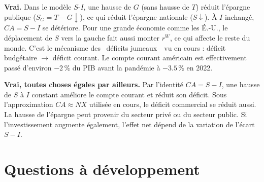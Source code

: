 
\begin{reponse}
\textbf{Vrai.} Dans le modèle $S$-$I$, une hausse de $G$ (sans hausse de $T$) réduit l'épargne publique ($S_G = T - G \downarrow$), ce qui réduit l'épargne nationale ($S \downarrow$). À $I$ inchangé, $CA = S - I$ se détériore. Pour une grande économie comme les É.-U., le déplacement de $S$ vers la gauche fait aussi monter $r^W$, ce qui affecte le reste du monde. C'est le mécanisme des \guillemotleft~déficits jumeaux~\guillemotright\ vu en cours : déficit budgétaire $\to$ déficit courant. Le compte courant américain est effectivement passé d'environ $-2\,\%$ du PIB avant la pandémie à $-3.5\,\%$ en 2022.
\end{reponse}


\begin{reponse}
\textbf{Vrai, toutes choses égales par ailleurs.} Par l'identité $CA = S - I$, une hausse de $S$ à $I$ constant améliore le compte courant et réduit son déficit. Sous l'approximation $CA \approx NX$ utilisée en cours, le déficit commercial se réduit aussi. La hausse de l'épargne peut provenir du secteur privé ou du secteur public. Si l'investissement augmente également, l'effet net dépend de la variation de l'écart $S - I$.
\end{reponse}

\section{Questions à développement}

\setcounter{shortcounter}{0}


